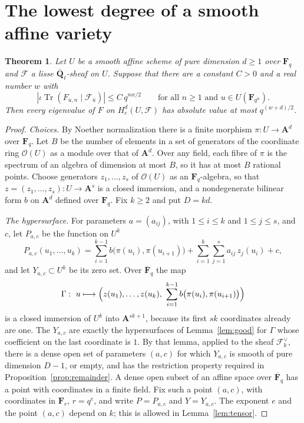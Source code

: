 \documentclass[11pt,a4paper]{article}
\theoremstyle{plain}
\newtheorem{theorem}{Theorem}
\theoremstyle{remark}
\newcommand{\Fq}{\mathbf F_q}
\newcommand{\Fqb}{\overline{\mathbf F}_q}
\newcommand{\Ql}{\overline{\mathbf Q}_\ell}
\newcommand{\A}{\mathbf A}
\newcommand{\F}{\mathcal F}
\newcommand{\Tr}{\operatorname{Tr}}
\begin{document}
\section{The lowest degree of a smooth affine variety}\label{sec:middle}

\begin{theorem}\label{thm:middle}
Let $U$ be a smooth affine scheme of pure dimension $d\ge1$ over $\Fq$ and $\F$ a lisse $\Ql$-sheaf on $U$. Suppose
that there are a constant $C>0$ and a real number $w$ with
\[
|\iota\Tr(F_{u,n}\mid\F_{\bar u})|\le C\,q^{nw/2}\qquad\text{for all }n\ge1\text{ and }u\in U(\mathbf F_{q^n}).
\]
Then every eigenvalue of $F$ on $H^d_c(U,\F)$ has absolute value at most $q^{(w+d)/2}$.
\end{theorem}

\begin{proof}
\emph{Choices.} By Noether normalization \cite[Tag 00OY]{Stacks} there is a finite morphism $\pi:U\to\A^d$ over
$\Fq$. Let $B$ be the number of elements in a set of generators of the coordinate ring $\mathcal O(U)$ as a module
over that of $\A^d$. Over any field, each fibre of $\pi$ is the spectrum of an algebra of dimension at most $B$, so
it has at most $B$ rational points. Choose generators $z_1,\dots,z_s$ of $\mathcal O(U)$ as an $\Fq$-algebra, so that
$z=(z_1,\dots,z_s):U\to\A^s$ is a closed immersion, and a nondegenerate bilinear form $b$ on $\A^d$ defined over
$\Fq$. Fix $k\ge2$ and put $D=kd$.

\emph{The hypersurface.} For parameters $a=(a_{ij})$, with $1\le i\le k$ and $1\le j\le s$, and $c$, let $P_{a,c}$
be the function on $U^k$
\[
P_{a,c}(u_1,\dots,u_k)=\sum_{i=1}^{k-1}b\bigl(\pi(u_i),\pi(u_{i+1})\bigr)+\sum_{i=1}^k\sum_{j=1}^sa_{ij}\,z_j(u_i)+c,
\]
and let $Y_{a,c}\subset U^k$ be its zero set. Over $\Fqb$ the map
\[
\Gamma:\ u\longmapsto\Bigl(z(u_1),\dots,z(u_k),\ \sum_{i=1}^{k-1}b\bigl(\pi(u_i),\pi(u_{i+1})\bigr)\Bigr)
\]
is a closed immersion of $U^k$ into $\A^{sk+1}$, because its first $sk$ coordinates already are one. The $Y_{a,c}$
are exactly the hypersurfaces of Lemma~\ref{lem:good} for $\Gamma$ whose coefficient on the last coordinate is $1$.
By that lemma, applied to the sheaf $\F_k^\vee$, there is a dense open set of parameters $(a,c)$ for which $Y_{a,c}$
is smooth of pure dimension $D-1$, or empty, and has the restriction property required in
Proposition~\ref{prop:remainder}. A dense open subset of an affine space over $\Fqb$ has a point with coordinates in
a finite field. Fix such a point $(a,c)$, with coordinates in $\mathbf F_r$, $r=q^e$, and write $P=P_{a,c}$ and
$Y=Y_{a,c}$. The exponent $e$ and the point $(a,c)$ depend on $k$; this is allowed in Lemma~\ref{lem:tensor}.


\end{proof}
\end{document}
